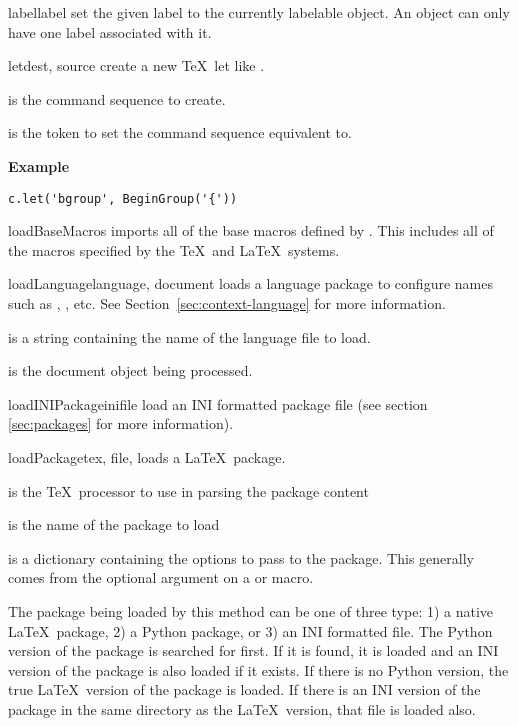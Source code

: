 \begin{methoddesc}[Context]{label}{label}
set the given label to the currently labelable object.  An object can 
only have one label associated with it.
\end{methoddesc}

\begin{methoddesc}[Context]{let}{dest, source}
create a new \TeX\ let like .

 is the command sequence to create.

 is the token to set the command sequence equivalent to.

\textbf{Example}
\begin{verbatim}
c.let('bgroup', BeginGroup('{'))
\end{verbatim}
\end{methoddesc}

\begin{methoddesc}[Context]{loadBaseMacros}{}
imports all of the base macros defined by \plasTeX.  This includes all of
the macros specified by the \TeX\ and \LaTeX\ systems.
\end{methoddesc}

\begin{methoddesc}[Context]{loadLanguage}{language, document}
loads a language package to configure names such as ,
, etc. See Section~\ref{sec:context-language} for more
information.

 is a string containing the name of the language file to load.

 is the document object being processed.
\end{methoddesc}

\begin{methoddesc}[Context]{loadINIPackage}{inifile}
load an INI formatted package file (see section \ref{sec:packages} for 
more information).
\end{methoddesc}

\begin{methoddesc}[Context]{loadPackage}{tex, file, }
loads a \LaTeX\ package.  

 is the \TeX\ processor to use in parsing the package content

 is the name of the package to load

 is a dictionary containing the options to pass to the package.
This generally comes from the optional argument on a 
or  macro.

The package being loaded by this method can be one of three type: 1)
a native \LaTeX\ package, 2) a Python package, or 3) an INI formatted file.
The Python version of the package is searched for first.  If it is found,
it is loaded and an INI version of the package is also loaded if it
exists.  If there is no Python version, the true \LaTeX\ version of the
package is loaded.  If there is an INI version of the package in the same
directory as the \LaTeX\ version, that file is loaded also.
\end{methoddesc}

